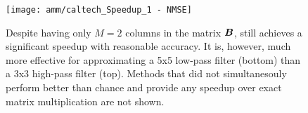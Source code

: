 
\begin{figure}[h]
\begin{center}
\texttt{[image: amm/caltech\_Speedup\_1 - NMSE]}
\caption{Despite having only $M=2$ columns in the matrix $\bm{B}$, \oursp still achieves a significant speedup with reasonable accuracy. It is, however, much more effective for approximating a 5x5 low-pass filter (bottom) than a 3x3 high-pass filter (top). Methods that did not simultanesouly perform better than chance and provide any speedup over exact matrix multiplication are not shown.}
\label{fig:caltech}
\end{center}
\end{figure}


